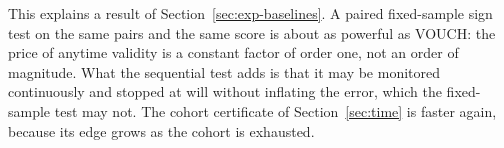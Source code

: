 \begin{table}[t]
\centering\small
\caption{Expected sample sizes in the sign model, $\alpha=0.05$ (one arm at level
$0.025$, as in each direction of a two-sided test). Arm Wald: lower bound of
Proposition~\ref{prop:anytime}(i) for the arm; oracle: bound (ii) and simulated mean over
$2{,}000$ runs, which may exceed the bound by Monte Carlo error (standard error about
$1.6\%$ of the mean); grid: simulated mean of the $10$-stake constant mixture over $500$
runs; $n_{50},n_{80},n_{90}$: smallest $n$ for which the exact two-sided binomial
sign test at level $0.05$ has the stated power.}
\label{tab:anytime}

\end{table}

This explains a result of Section~\ref{sec:exp-baselines}. A paired fixed-sample sign test
on the same pairs and the same score is about as powerful as VOUCH: the price of anytime
validity is a constant factor of order one, not an order of magnitude. What the sequential
test adds is that it may be monitored continuously and stopped at will without inflating
the error, which the fixed-sample test may not. The cohort certificate of
Section~\ref{sec:time} is faster again, because its edge grows as the cohort is exhausted.
